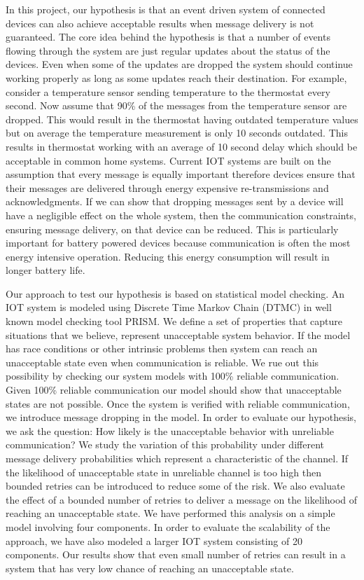 In this project, our hypothesis is that an event driven system of connected devices can also achieve acceptable results when message delivery is not guaranteed. The core idea behind the hypothesis is that a number of events flowing through the system are just regular updates about the status of the devices. Even when some of the updates are dropped the system should continue working properly as long as some updates reach their destination. For example, consider a temperature sensor sending temperature to the thermostat every second. Now assume that 90\% of the messages from the temperature sensor are dropped. This would result in the thermostat having outdated temperature values but on average the temperature measurement is only 10 seconds outdated. This results in thermostat working with an average of 10 second delay which should be acceptable in common home systems. Current IOT systems are built on the assumption that every message is equally important therefore devices ensure that their messages are delivered through energy expensive re-transmissions and acknowledgments. If we can show that dropping messages sent by a device will have a negligible effect on the whole system, then the communication constraints, ensuring message delivery, on that device can be reduced. This is particularly important for battery powered devices because communication is often the most energy intensive operation. Reducing this energy consumption will result in longer battery life. 

Our approach to test our hypothesis is based on statistical model checking. An IOT system is modeled using Discrete Time Markov Chain (DTMC) in well known model checking tool PRISM. We define a set of properties that capture situations that we believe, represent unacceptable system behavior. If the model has race conditions or other intrinsic problems then system can reach an unacceptable state even when communication is reliable. We rue out this possibility by checking our system models with 100\% reliable communication. Given 100\% reliable communication our model should show that unacceptable states are not possible. Once the system is verified with reliable communication, we introduce message dropping in the model. In order to evaluate our hypothesis, we ask the question: How likely is the unacceptable behavior with unreliable communication? We study the variation of this probability under different message delivery probabilities which represent a characteristic of the channel. If the likelihood of unacceptable state in unreliable channel is too high then bounded retries can be introduced to reduce some of the risk. We also evaluate the effect of a bounded number of retries to deliver a message on the likelihood of reaching an unacceptable state. We have performed this analysis on a simple model involving four components. In order to evaluate the scalability of the approach, we have also modeled a larger IOT system consisting of 20 components. Our results show that even small number of retries can result in a system that has very low chance of reaching an unacceptable state.
